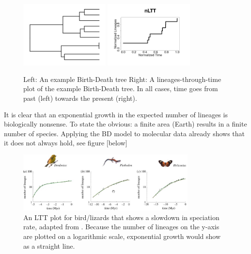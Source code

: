 \begin{figure}[H]
  \includegraphics[width=0.4\textwidth]{bd_tree.png}
  \includegraphics[width=0.4\textwidth]{bd_tree_nltt.png}
  \caption{
    Left: An example Birth-Death tree
    Right: A lineages-through-time plot of the example Birth-Death tree.
    In all cases, time goes from past (left) towards the present (right).
  }
  \label{fig:bd}
\end{figure}

It is clear that an exponential growth in the expected number of lineages
is biologically nonsense. 
To state the obvious: a finite area (Earth) results in a finite number of species. 
Applying the BD model to molecular data already shows that it does not
always hold, see figure [below]

\begin{figure}[H]
  \includegraphics[width=0.8\textwidth]{etienne_et_al_2012_dd.png}
  \caption{
    An LTT plot for bird/lizards that shows a slowdown in speciation
    rate, adapted from \cite{etienne2012diversity}. Because the number
    of lineages on the y-axis are plotted on a logarithmic scale,
    exponential growth would show as a straight line. 
  }
  \label{fig:bd}
\end{figure}


